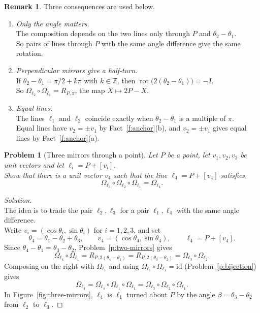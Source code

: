 \documentclass[11pt,a4paper]{article}
\theoremstyle{boxed}
\newtheorem{problem}{Problem}
\theoremstyle{definition}
\newtheorem*{remark}{Remark}
\newenvironment{solution}{\begin{proof}[Solution]}{\end{proof}}
\newcommand{\id}{\mathrm{id}}
\DeclareMathOperator{\rot}{rot}
\begin{document}
\begin{remark}
Three consequences are used below.
\begin{enumerate}[label=(\roman*)]
    \item \emph{Only the angle matters.}\\
    The composition depends on the two lines only through $P$ and $\theta_2-\theta_1$.\\
    So pairs of lines through $P$ with the same angle difference give the same rotation.
    \item \emph{Perpendicular mirrors give a half-turn.}\\
    If $\theta_2-\theta_1=\pi/2+k\pi$ with $k\in\mathbb{Z}$, then $\rot\bigl(2(\theta_2-\theta_1)\bigr)=-I$.\\
    So $\Omega_{\ell_2}\circ\Omega_{\ell_1}=R_{P,\pi}$, the map $X\mapsto2P-X$.
    \item \emph{Equal lines.}\\
    The lines $\ell_1$ and $\ell_2$ coincide exactly when $\theta_2-\theta_1$ is a multiple of $\pi$.\\
    Equal lines have $v_2=\pm v_1$ by Fact~\ref{f:anchor}(b), and $v_2=\pm v_1$ gives equal lines by Fact~\ref{f:anchor}(a).
\end{enumerate}
\end{remark}

\begin{problem}[Three mirrors through a point]\label{p:three-concurrent}
Let $P$ be a point, let $v_1,v_2,v_3$ be unit vectors and let $\ell_i=P+[v_i]$.\\
Show that there is a unit vector $v_4$ such that the line $\ell_4=P+[v_4]$ satisfies
\[
\Omega_{\ell_3}\circ\Omega_{\ell_2}\circ\Omega_{\ell_1}=\Omega_{\ell_4}.
\]
\end{problem}

\begin{solution}
\leavevmode\\
The idea is to trade the pair $\ell_2,\ell_3$ for a pair $\ell_1,\ell_4$ with the same angle difference.\\
Write $v_i=(\cos\theta_i,\sin\theta_i)$ for $i=1,2,3$, and set
\[
\theta_4=\theta_1-\theta_2+\theta_3, \qquad v_4=(\cos\theta_4,\sin\theta_4), \qquad \ell_4=P+[v_4].
\]
Since $\theta_4-\theta_1=\theta_3-\theta_2$, Problem~\ref{p:two-mirrors} gives
\[
\Omega_{\ell_4}\circ\Omega_{\ell_1}=R_{P,2(\theta_4-\theta_1)}=R_{P,2(\theta_3-\theta_2)}=\Omega_{\ell_3}\circ\Omega_{\ell_2}.
\]
Composing on the right with $\Omega_{\ell_1}$ and using $\Omega_{\ell_1}\circ\Omega_{\ell_1}=\id$ (Problem~\ref{p:bijection}) gives
\[
\Omega_{\ell_4}=\Omega_{\ell_4}\circ\Omega_{\ell_1}\circ\Omega_{\ell_1}=\Omega_{\ell_3}\circ\Omega_{\ell_2}\circ\Omega_{\ell_1}.
\]
In Figure~\ref{fig:three-mirrors}, $\ell_4$ is $\ell_1$ turned about $P$ by the angle $\beta=\theta_3-\theta_2$ from $\ell_2$ to $\ell_3$.
\end{solution}
\end{document}
